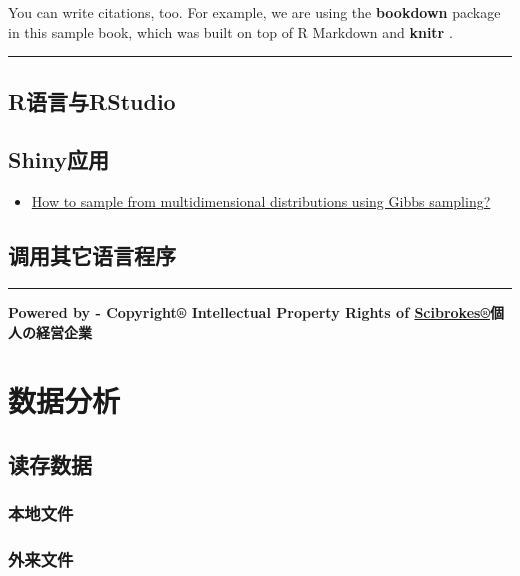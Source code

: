 \documentclass[]{book}
\providecommand{\tightlist}{%
  \setlength{\itemsep}{0pt}\setlength{\parskip}{0pt}}
\begin{document}
You can write citations, too. For example, we are using the
\textbf{bookdown} package \citep{R-bookdown} in this sample book, which
was built on top of R Markdown and \textbf{knitr} \citep{xie2015}.

\begin{center}\rule{0.5\linewidth}{\linethickness}\end{center}

\section{R语言与RStudio}\label{rrstudio}

\section{Shiny应用}\label{shiny}

\begin{itemize}
\tightlist
\item
  \href{https://appsilon.com/how-to-sample-from-multidimensional-distributions-using-gibbs-sampling/}{How
  to sample from multidimensional distributions using Gibbs sampling?}
\end{itemize}

\section{调用其它语言程序}

\begin{center}\rule{0.5\linewidth}{\linethickness}\end{center}

\textbf{Powered by - Copyright® Intellectual Property Rights of
\href{http://www.scibrokes.com}{Scibrokes®}個人の経営企業}

\chapter{数据分析}\label{analytics}

\section{读存数据}

\subsection{本地文件}

\subsection{外来文件}
\end{document}
